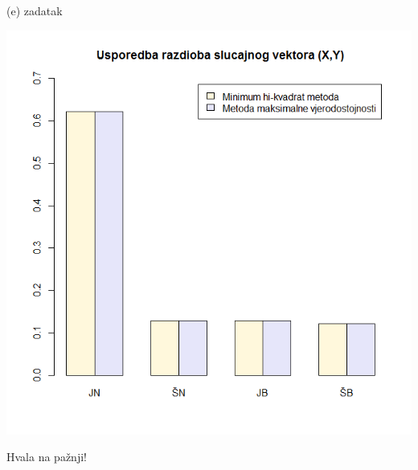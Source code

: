 \documentclass{beamer}
\begin{document}
\begin{frame}{(e) zadatak}
\begin{center}
\includegraphics[scale=0.25]{6.png}\\
\end{center}
\end{frame}

\begin{frame}
\begin{center}
Hvala na pažnji!
\end{center}
\end{frame}
\end{document}
